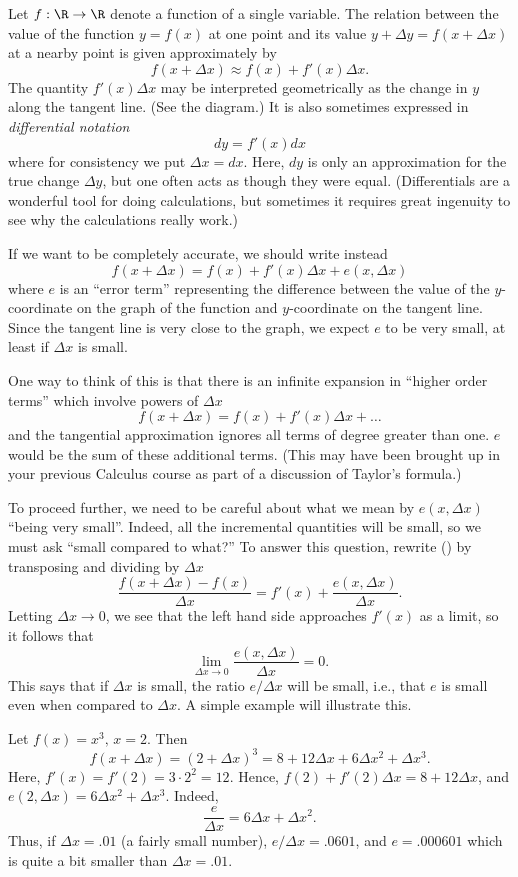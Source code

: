 Let $f:\R\to \R$ denote a function of a single variable. 
The relation between the value of the function 
$y = f(x)$ at one point and its value 
$y + \Delta y = f(x + \Delta x)$ at a nearby point is
given approximately by
$$
   f(x + \Delta x) \approx f(x) + f'(x)\Delta x.
$$
The quantity $f'(x)\Delta x$ may be interpreted geometrically
as the change in $y$ along the tangent line.  (See the
diagram.)  It is also sometimes
expressed in  {\it differential notation\/}
$$
    dy = f'(x) dx
$$
where for consistency we put $\Delta x = dx$.  Here, $dy$ is
only an approximation for the true change $\Delta y$, but one
often acts as though they were equal.  (Differentials are a wonderful
tool for doing calculations, but sometimes it requires great
ingenuity to see why the calculations really work.)
%
\medskip
\centerline{}
\medskip
  If we
want to be completely accurate, we should write instead
\nexteqn
\xdef\EqAp{\eqn}
$$
   f(x + \Delta x) = f(x) + f'(x)\Delta x + e(x,\Delta x)
$$  
where $e$ is an ``error term'' representing the difference between
the value of the $y$-coordinate on the graph of the function and
$y$-coordinate on the tangent line.  Since the tangent line is
very close to the graph, we
expect $e$ to be very small,
 at least if $\Delta x$ is small. 

One way to think of this is that there is an infinite expansion
in ``higher order terms'' which involve powers of $\Delta x$
$$
   f(x+ \Delta x) = f(x) + f'(x)\Delta x + \dots
$$
and the tangential approximation ignores
all terms of degree greater than one.
$e$ would  be the sum of these additional terms.
(This may have been brought up in your previous Calculus
course as part of a discussion of Taylor's formula.)

To proceed further, we need to be careful about what we mean
by $e(x,\Delta x)$ ``being very small''.   Indeed, all the incremental
quantities will be small, so we must ask ``small compared to
what?''  To answer this question, rewrite (\EqAp) by transposing
and dividing by $\Delta x$
$$
\frac{f(x + \Delta x) - f(x)}{\Delta x}
=  f'(x) + \frac{e(x,\Delta x)}{\Delta x}.
$$
Letting $\Delta x \to 0$, we see that the left hand side
approaches $f'(x)$ as a limit, so it follows that
$$
\lim_{\Delta x \to 0} \frac{e(x,\Delta x)}{\Delta x} = 0.
$$
This says that if $\Delta x$ is small, the ratio $e/\Delta x$ will
be small, i.e., that $e$ is  small even when compared
to $\Delta x$.  A simple example will illustrate this.

\nextex
\xdef\ExOne{\en}
  Let $f(x) = x^3, \, x = 2$.  Then
$$
   f(x +\Delta x) = (2 + \Delta x)^3 = 8 + 12\Delta x + 6\Delta x^2 +
        \Delta x^3.
$$
Here, $f'(x) = f'(2) = 3\cdot 2^2 = 12$.  Hence,
$f(2) + f'(2)\Delta x = 8 + 12\Delta x$, and $e(2,\Delta x) =
6\Delta x^2 + \Delta x^3$. Indeed,
$$
    \frac{e}{\Delta x} =  6\Delta x + \Delta x^2.
$$
Thus, if $\Delta x = .01$ (a fairly small number), $e/\Delta x
 = .0601$, and $e = .000601$ which is quite a bit smaller than
$\Delta x = .01$.
\endexample

